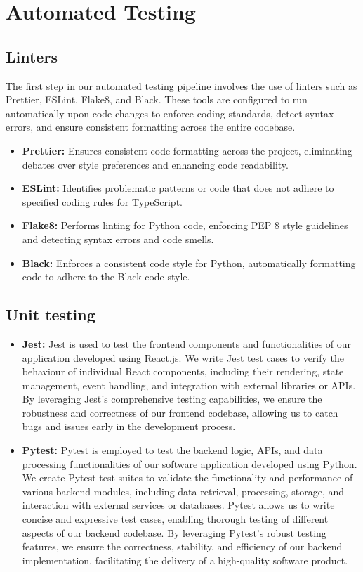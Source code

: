 \documentclass[12pt, titlepage]{article}
\begin{document}
\section{Automated Testing}
\subsection{Linters}
The first step in our automated testing pipeline involves the use of linters such as Prettier, ESLint, Flake8, and Black. These tools are configured to run automatically upon code changes to enforce coding standards, detect syntax errors, and ensure consistent formatting across the entire codebase.
\begin{itemize}
    \item \textbf{Prettier:} Ensures consistent code formatting across the project, eliminating debates over style preferences and enhancing code readability.
    \item \textbf{ESLint:} Identifies problematic patterns or code that does not adhere to specified coding rules for TypeScript.
    \item \textbf{Flake8:} Performs linting for Python code, enforcing PEP 8 style guidelines and detecting syntax errors and code smells.
    \item \textbf{Black:} Enforces a consistent code style for Python, automatically formatting code to adhere to the Black code style. 
\end{itemize}

\subsection{Unit testing}
\begin{itemize}
    \item \textbf{Jest:} Jest is used to test the frontend components and functionalities of our application developed using React.js. We write Jest test cases to verify the behaviour of individual React components, including their rendering, state management, event handling, and integration with external libraries or APIs. By leveraging Jest's comprehensive testing capabilities, we ensure the robustness and correctness of our frontend codebase, allowing us to catch bugs and issues early in the development process.
    \item \textbf{Pytest:} Pytest is employed to test the backend logic, APIs, and data processing functionalities of our software application developed using Python. We create Pytest test suites to validate the functionality and performance of various backend modules, including data retrieval, processing, storage, and interaction with external services or databases. Pytest allows us to write concise and expressive test cases, enabling thorough testing of different aspects of our backend codebase. By leveraging Pytest's robust testing features, we ensure the correctness, stability, and efficiency of our backend implementation, facilitating the delivery of a high-quality software product.
\end{itemize}
\end{document}
